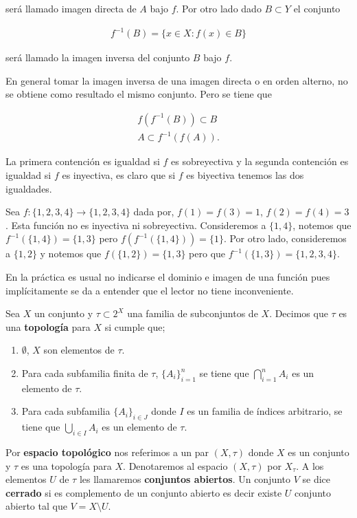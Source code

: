 será llamado imagen directa de $A$ bajo $f$. Por otro lado  dado $B \subset Y$ el conjunto 

\begin{align*}
f^{-1}(B)=\{x \in X :  f(x) \in B \}
\end{align*}

será llamado la imagen inversa del conjunto $B$ bajo $f$. 

\begin{ob}
En general tomar la imagen inversa de una imagen directa o en orden alterno, no se obtiene como resultado el mismo conjunto. Pero se tiene que

	
	\begin{align*}
	f(f^{-1}(B)) \subset B \\
	A \subset f^{-1}(f(A)) .
	\end{align*}

La primera contención es igualdad si $f$ es sobreyectiva y la segunda contención es igualdad si $f$ es inyectiva, es claro que si $f$ es biyectiva tenemos las dos igualdades. 
\end{ob}

\begin{ej}
Sea $f:\{1,2,3,4\} \to \{1,2,3,4\}$ dada por, $f(1)=f(3)=1$, $f(2)=f(4)=3$. Esta función no es inyectiva ni sobreyectiva. Consideremos a $\{1,4\}$, notemos que $f^{-1}(\{1,4\})=\{1,3\}$ pero $f(f^{-1}(\{1,4\}))=\{1\}$. Por otro lado, consideremos a $\{1,2\}$ y notemos que $f(\{1,2\})=\{1,3\}$  pero que $f^{-1}(\{1,3\})=\{1,2,3,4\}$.
\end{ej}

En la práctica es usual no indicarse el dominio e imagen de una función pues implícitamente se da a entender que el lector no tiene inconveniente.

\begin{df}
Sea $X$ un conjunto y $\tau \subset 2^X$ una familia de subconjuntos de $X$. Decimos que $\tau$ es una \textbf{topología} para $X$ si cumple que;

	\begin{enumerate}
		\item $\emptyset$, $X$ son elementos de  $\tau.$
		\item Para cada subfamilia finita de $\tau$, $\{A_i\}_{i=1}^n$ se tiene que $\bigcap_{i=1}^n A_i$ es un elemento de $\tau.$ 
		\item Para cada subfamilia $\{A_i\}_{i \in J}$ donde $I$ es un familia de índices arbitrario, se tiene que $\bigcup_{i \in I} A_i$ es un elemento de $\tau$.
	\end{enumerate}

Por \textbf{espacio topológico} nos referimos a un par $(X,\tau)$ donde $X$ es un conjunto y $\tau$ es una topología para $X$. Denotaremos al espacio $(X, \tau)$ por $X_{\tau}$. A los elementos $U$ de $\tau$  les llamaremos \textbf{conjuntos abiertos}. Un conjunto $V$ se dice \textbf{cerrado} si es complemento de un conjunto abierto es decir existe $U$ conjunto abierto tal que $V=X \setminus U$.  
\end{df}

